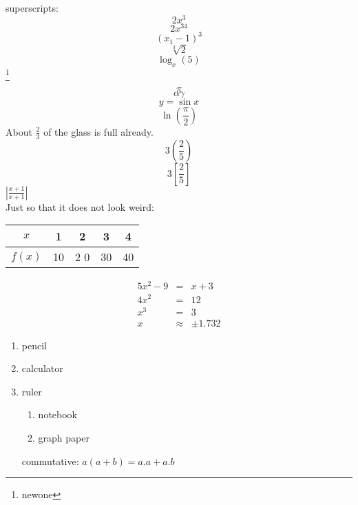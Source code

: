 \documentclass[11pt]{article}
\begin{document}
superscripts: $$2x^3$$
$$2x^34$$
$$(x_1-1)^3$$
$$\sqrt[3]{2}$$
$$\log_x(5)$$
\footnote{newone}
\label{h1} 

$$\pi$$ $$\alpha \gamma$$
$$y = \sin{x}$$
$$\ln{(\displaystyle{\frac{\pi}{2}})}$$
About $\displaystyle{\frac{2}{3}}$ of the glass is full already. 
$$3\left(\frac{2}{5}\right)$$
$$3\left[\frac{2}{5}\right]$$
$\left|\displaystyle{\frac{x+1}{x+1}}\right|$ \\

Just so that it does not look weird:\\
\begin{tabular}{|c|c|c|c|c|}
\hline
$x$ & 1 & 2 & 3 & 4 \\ \hline
$f(x)$ & 10 & 2 0& 30 & 40 \\ \hline
\end{tabular}

\begin{eqnarray}
5x^2-9 &=& x+3\\
4x^2 &=& 12\\
x^3 &=& 3 \\
x &\approx& \pm 1.732 
\end{eqnarray}
\begin{enumerate}
\item pencil
\item calculator 
\item ruler
  \begin{enumerate}
  \item notebook
  \item graph paper
  \end{enumerate}


\end{enumerate}
\begin{enumerate}
  \item[commutative:] $a(a+b)= a.a + a.b$
\end{enumerate}
\end{document}
